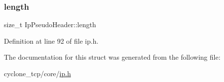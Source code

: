 \mbox{\label{structIpPseudoHeader_aeff06b8d9c3e7e2ef3cdb8a3a14e8ad2}} 
\subsubsection{\texorpdfstring{length}{length}}
{\footnotesize\ttfamily size\+\_\+t Ip\+Pseudo\+Header\+::length}



Definition at line 92 of file ip.\+h.



The documentation for this struct was generated from the following file\+:\begin{DoxyCompactItemize}
\item 
cyclone\+\_\+tcp/core/\hyperlink{ip_8h}{ip.\+h}\end{DoxyCompactItemize}
